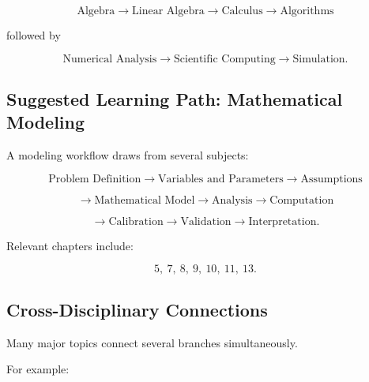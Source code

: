 \[
\boxed{
\text{Algebra}
\rightarrow
\text{Linear Algebra}
\rightarrow
\text{Calculus}
\rightarrow
\text{Algorithms}
}
\]

followed by

\[
\boxed{
\text{Numerical Analysis}
\rightarrow
\text{Scientific Computing}
\rightarrow
\text{Simulation}.
}
\]

\subsection{Suggested Learning Path: Mathematical Modeling}
\label{subsec:index-learning-path-modeling}

A modeling workflow draws from several subjects:

\[
\boxed{
\text{Problem Definition}
\rightarrow
\text{Variables and Parameters}
\rightarrow
\text{Assumptions}
}
\]

\[
\boxed{
\rightarrow
\text{Mathematical Model}
\rightarrow
\text{Analysis}
\rightarrow
\text{Computation}
}
\]

\[
\boxed{
\rightarrow
\text{Calibration}
\rightarrow
\text{Validation}
\rightarrow
\text{Interpretation}.
}
\]

Relevant chapters include:

\[
\boxed{
5,\ 7,\ 8,\ 9,\ 10,\ 11,\ 13.
}
\]

\subsection{Cross-Disciplinary Connections}
\label{subsec:index-cross-disciplinary-connections}

Many major topics connect several branches simultaneously.

For example:

